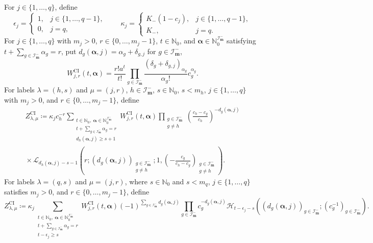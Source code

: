 \documentclass[10pt]{amsart}
\newcommand{\Nzero}{\mathbb N_0}
\theoremstyle{plain}
\theoremstyle{definition}
\theoremstyle{remark}
\begin{document}
For \(j\in\{1,\ldots,q\}\), define
\[
 \epsilon_j=\begin{cases}1,&j\in\{1,\ldots,q-1\},\\0,&j=q,\end{cases}
 \qquad
 \kappa_j=\begin{cases}
 K_-(1-c_j),&j\in\{1,\ldots,q-1\},\\
 K_-,&j=q.
 \end{cases}
\]
For \(j\in\{1,\ldots,q\}\) with \(m_j>0\),
\(r\in\{0,\ldots,m_j-1\}\), \(t\in\Nzero\), and
\(\boldsymbol\alpha\in
\mathbb N_0^{\mathcal I_{\boldsymbol m}^-}\) satisfying
\(t+\sum_{g\in\mathcal I_{\boldsymbol m}^-}\alpha_g=r\), put
\(d_g(\boldsymbol\alpha,j)=\alpha_g+\delta_{g,j}\) for
\(g\in\mathcal I_{\boldsymbol m}^-\),
\begin{equation}
 W_{j,r}^{\mathrm{CI}}(t,\boldsymbol\alpha)
 =\frac{r!a^t}{t!}
 \prod_{g\in\mathcal I_{\boldsymbol m}^-}
 \frac{(\delta_g+\delta_{g,j})_{\alpha_g}}{\alpha_g!}
 c_g^{\alpha_g}.
 \label{eq:typeI-CI-W}
\end{equation}
For labels \(\lambda=(h,s)\) and \(\mu=(j,r)\),
\(h\in\mathcal I_{\boldsymbol m}^-\), \(s\in\Nzero\), \(s<m_h\),
\(j\in\{1,\ldots,q\}\) with \(m_j>0\), and
\(r\in\{0,\ldots,m_j-1\}\), define
\begin{multline}
 Z_{\lambda,\mu}^{\mathrm{CI}}
 \coloneq
 \kappa_jc_h^{-r}
 \sum_{\substack{t\in\Nzero,\ 
                  \boldsymbol\alpha\in\mathbb N_0^{\mathcal I_{\boldsymbol m}^-}\\
                  t+\sum_{g\in\mathcal I_{\boldsymbol m}^-}\alpha_g=r\\
 d_h(\boldsymbol\alpha,j)\ge s+1}}
 W_{j,r}^{\mathrm{CI}}(t,\boldsymbol\alpha)
 \prod_{\substack{g\in\mathcal I_{\boldsymbol m}^-\\g\ne h}}
 \left(\frac{c_h-c_g}{c_h}\right)^{-d_g(\boldsymbol\alpha,j)}
 \\
 {}\times
 \mathscr L_{d_h(\boldsymbol\alpha,j)-s-1}
 \left(
 r;(d_g(\boldsymbol\alpha,j))_{
      \substack{g\in\mathcal I_{\boldsymbol m}^-\\g\ne h}};
 1,
 \left(-\frac{c_g}{c_h-c_g}\right)_{
       \substack{g\in\mathcal I_{\boldsymbol m}^-\\g\ne h}}
 \right).
 \label{eq:typeI-CI-Z-finite}
\end{multline}
For labels \(\lambda=(q,s)\) and \(\mu=(j,r)\), where
\(s\in\Nzero\) and \(s<m_q\),
\(j\in\{1,\ldots,q\}\) satisfies \(m_j>0\), and
\(r\in\{0,\ldots,m_j-1\}\), define
\begin{equation}
 Z_{\lambda,\mu}^{\mathrm{CI}}
 \coloneq
 \kappa_j
 \sum_{\substack{t\in\Nzero,\ 
                  \boldsymbol\alpha\in\mathbb N_0^{\mathcal I_{\boldsymbol m}^-}\\
                  t+\sum_{g\in\mathcal I_{\boldsymbol m}^-}\alpha_g=r\\
                  t-\epsilon_j\ge s}}
 W_{j,r}^{\mathrm{CI}}(t,\boldsymbol\alpha)
 (-1)^{\sum_{g\in\mathcal I_{\boldsymbol m}^-}d_g(\boldsymbol\alpha,j)}
 \prod_{g\in\mathcal I_{\boldsymbol m}^-}
 c_g^{-d_g(\boldsymbol\alpha,j)}
 \mathscr H_{t-\epsilon_j-s}
 \left(
 (d_g(\boldsymbol\alpha,j))_{g\in\mathcal I_{\boldsymbol m}^-};
 (c_g^{-1})_{g\in\mathcal I_{\boldsymbol m}^-}
 \right).
 \label{eq:typeI-CI-Z-infinity}
\end{equation}
\end{document}
